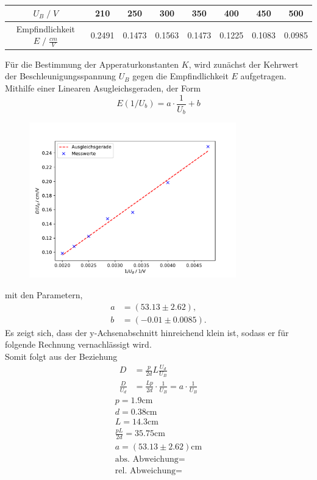 \begin{table}
    \centering
    \begin{tabular}{c | c c c c c c c}
        \toprule
        $U_B\;/\;V$&210&250&300&350&400&450&500\\
        \midrule
        Empfindlichkeit $E\;/\;\frac{cm}{V}$& 0.2491& 0.1473& 0.1563& 0.1473& 0.1225& 0.1083& 0.0985\\
        \bottomrule
    \end{tabular}
    \caption{}
\end{table}
\newpage
Für die Bestimmung der Apperaturkonstanten $K$, wird zunächst der Kehrwert der Beschleunigungsspannung $U_B$
gegen die Empfindlichkeit $E$ aufgetragen. Mithilfe einer Linearen Asugleichsgeraden, der Form
\begin{equation}
    E(1/U_b) = a\cdot \frac{1}{U_b} + b  \nonumber
\end{equation}
\begin{figure}
    \centering
    \includegraphics[width=0.8\textwidth]{plots/all2.pdf}
    \caption{}
\end{figure}
mit den Parametern,
\begin{align}
    a&=(53.13\pm2.62),\\
    b&=(-0.01\pm0.0085).
\end{align}
Es zeigt sich, dass der y-Achsenabschnitt hinreichend klein ist, sodass er für folgende Rechnung vernachlässigt wird.\\

Somit folgt aus der Beziehung
\begin{align}
    D&=\frac{p}{2d}L\frac{U_d}{U_B}\\
    \frac{D}{U_d}&=\frac{Lp}{2d} \cdot \frac{1}{U_B}=a\cdot \frac{1}{U_B}
\end{align}
\begin{align}
    p = 1.9\text{cm} \\
    d = 0.38\text{cm}\\
    L = 14.3\text{cm}\\
    \frac{pL}{2d} =35.75\text{cm} \\
    a = (53.13\pm2.62)\text{cm}\\
    \textrm{abs. Abweichung} = \\
    \textrm{rel. Abweichung} = \\
\end{align}

